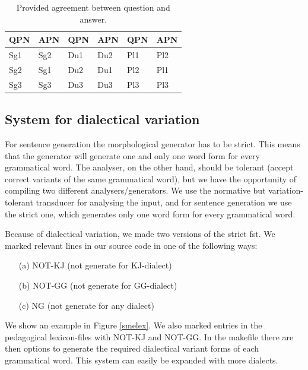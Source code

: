 \documentclass[11pt]{article}
\begin{document}
\begin{table}[htdp]
\caption{Provided agreement between question and answer.}
\begin{center}
\begin{tabular}[t]{ll|ll|ll}
QPN &APN &QPN &APN &QPN &APN \\
\hline
Sg1 &Sg2 &Du1 &Du2 &Pl1 &Pl2 \\
Sg2 &Sg1 &Du2 &Du1 &Pl2 &Pl1 \\
Sg3 &Sg3 &Du3 &Du3 &Pl3 &Pl3 \\
\hline
\end{tabular}
\end{center}
\label{QA}
\end{table}

\subsection{System for dialectical variation}\label{dialect}
For sentence generation the morphological generator has to be strict. This means that the generator will generate one and only one word form for every grammatical word. The analyser, on the other hand, should be tolerant (accept correct variants of the same grammatical word), but we have the opportunity of compiling two different analysers/generators. We use the normative but variation-tolerant transducer for analysing the input, and for sentence generation we use the strict one, which generates only one word form for every grammatical word.

Because of dialectical variation, we made two versions of the strict fst. We marked relevant lines in our source code in one of the following ways:

\begin{example}\label{ped}
\begin{itemize}
\item[(a)] NOT-KJ (not generate for KJ-dialect) 
\item[(b)] NOT-GG (not generate for GG-dialect)  
\item[(c)] NG (not generate for any dialect)
\end{itemize}
\end{example}

We show an example in Figure \ref{smelex}. We also marked entries in the pedagogical lexicon-files with NOT-KJ and NOT-GG. In the makefile there are then options to generate the required dialectical variant forms of each grammatical word. This system can easily be expanded with more dialects.
\end{document}
